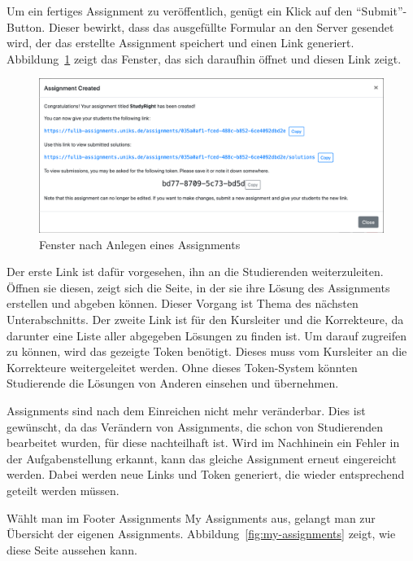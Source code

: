 Um ein fertiges Assignment zu veröffentlich, genügt ein Klick auf den ``Submit''-Button.
Dieser bewirkt, dass das ausgefüllte Formular an den Server gesendet wird, der das erstellte Assignment speichert und einen Link generiert.
Abbildung~\ref{fig:create-assignment-success} zeigt das Fenster, das sich daraufhin öffnet und diesen Link zeigt.

\begin{figure}
    \centering
    \includegraphics[width=\textwidth]{chapter/fulib.org/img/create-assignment-success.png}
    \caption{Fenster nach Anlegen eines Assignments}
    \label{fig:create-assignment-success}
\end{figure}

Der erste Link ist dafür vorgesehen, ihn an die Studierenden weiterzuleiten.
Öffnen sie diesen, zeigt sich die Seite, in der sie ihre Lösung des Assignments erstellen und abgeben können.
Dieser Vorgang ist Thema des nächsten Unterabschnitts.
Der zweite Link ist für den Kursleiter und die Korrekteure, da darunter eine Liste aller abgegeben Lösungen zu finden ist.
Um darauf zugreifen zu können, wird das gezeigte Token benötigt.
Dieses muss vom Kursleiter an die Korrekteure weitergeleitet werden.
Ohne dieses Token-System könnten Studierende die Lösungen von Anderen einsehen und übernehmen.

Assignments sind nach dem Einreichen nicht mehr veränderbar.
Dies ist gewünscht, da das Verändern von Assignments, die schon von Studierenden bearbeitet wurden, für diese nachteilhaft ist.
Wird im Nachhinein ein Fehler in der Aufgabenstellung erkannt, kann das gleiche Assignment erneut eingereicht werden.
Dabei werden neue Links und Token generiert, die wieder entsprechend geteilt werden müssen.

Wählt man im Footer Assignments \textrightarrow{} My Assignments aus, gelangt man zur Übersicht der eigenen Assignments.
Abbildung~\ref{fig:my-assignments} zeigt, wie diese Seite aussehen kann.

